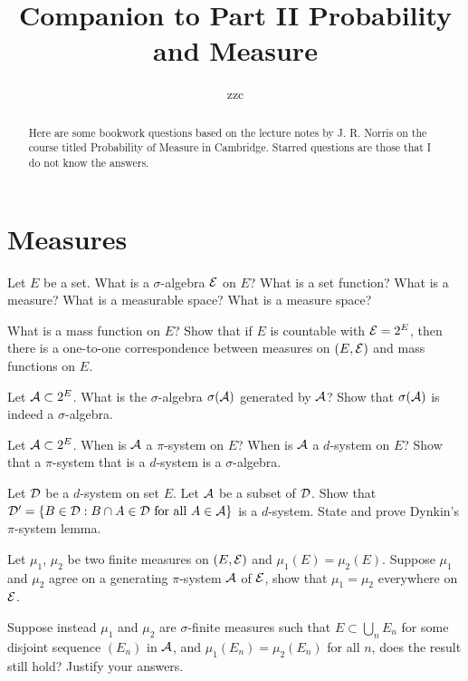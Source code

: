 


\title{Companion to Part II Probability and Measure}
\author{zzc}
\maketitle


\rhead{\today}

\begin{abstract}
    Here are some bookwork questions based on the lecture notes by J. R. Norris on the course titled Probability of Measure in Cambridge. Starred questions are those that I do not know the answers.
\end{abstract}
\tableofcontents


 \section{Measures}
\begin{question}{1}
Let $E$ be a set. What is a $\sigma$-algebra $\mathcal{E}$ on $E$? What is a set function? What is a measure? What is a measurable space? What is a measure space?

What is a mass function on $E$? Show that if $E$ is countable with $\mathcal{E} = 2^E$, then there is a one-to-one correspondence between measures on $(E,\mathcal{E})$ and mass functions on $E$.
\end{question}

\begin{question}{2}
Let $\mathcal{A} \subset 2^E$. What is the $\sigma$-algebra $\sigma(\mathcal{A})$ generated by $\mathcal{A}$? Show that $\sigma(\mathcal{A})$ is indeed a $\sigma$-algebra.

Let $\mathcal{A} \subset 2^E$.  When is $\mathcal{A}$ a $\pi$-system on $E$? When is $\mathcal{A}$ a $d$-system on $E$? Show that a $\pi$-system that is a $d$-system is a $\sigma$-algebra. 

Let $\mathcal{D}$ be a $d$-system on set $E$. Let $\mathcal{A}$ be a subset of $\mathcal{D}$. Show that $\mathcal{D}' = \{B\in \mathcal{D}: B\cap A \in \mathcal{D} \text{ for all } A\in \mathcal{A}\}$ is a $d$-system. State and prove Dynkin's $\pi$-system lemma.

Let $\mu_1$, $\mu_2$ be two finite measures on $(E,\mathcal{E})$ and $\mu_1(E) = \mu_2(E)$. Suppose $\mu_1$ and $\mu_2$ agree on a generating $\pi$-system $\mathcal{A}$ of $\mathcal{E}$, show that $\mu_1 = \mu_2$ everywhere on $\mathcal{E}$. 

Suppose instead $\mu_1$ and $\mu_2$ are $\sigma$-finite measures such that $E \subset \bigcup_n E_n$ for some disjoint sequence $(E_n)$ in $\mathcal{A}$, and $\mu_1(E_n) = \mu_2(E_n)$ for all $n$, does the result still hold? Justify your answers.

\end{question}

